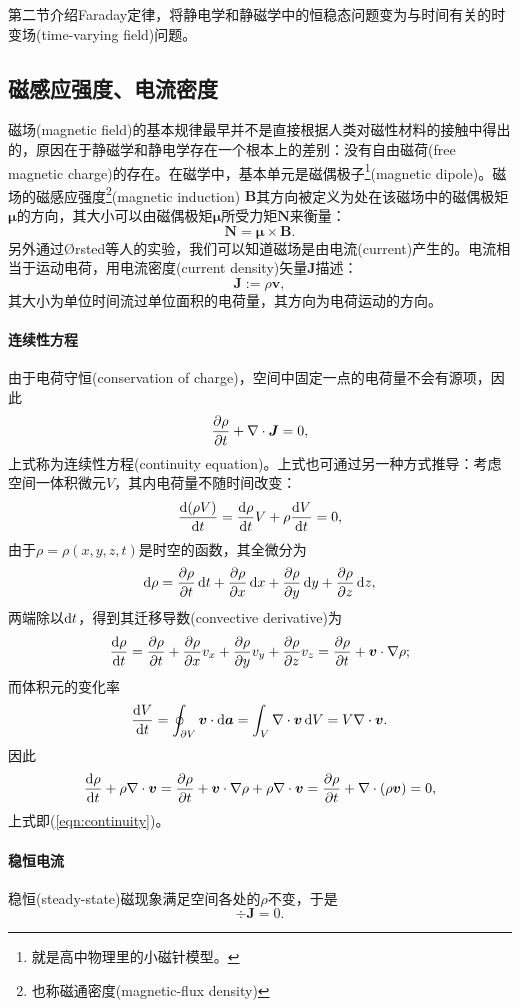 第二节介绍Faraday定律，将静电学和静磁学中的恒稳态问题变为与时间有关的时变场(time-varying field)问题。

\subsection{磁感应强度、电流密度}
磁场(magnetic field)的基本规律最早并不是直接根据人类对磁性材料的接触中得出的，原因在于静磁学和静电学存在一个根本上的差别：没有自由磁荷(free magnetic charge)的存在。在磁学中，基本单元是磁偶极子\footnote{就是高中物理里的小磁针模型。}(magnetic dipole)。磁场的磁感应强度\footnote{也称磁通密度(magnetic-flux density)}(magnetic induction) $\bm B$其方向被定义为处在该磁场中的磁偶极矩$\bm\mu$的方向，其大小可以由磁偶极矩$\bm\mu$所受力矩$\bm N$来衡量：
\begin{equation}
    \bm N=\bm\mu\times\bm B.
\end{equation}
另外通过Ørsted等人的实验，我们可以知道磁场是由电流(current)产生的。电流相当于运动电荷，用电流密度(current density)矢量$\bm J$描述：
\begin{equation}
    \bm J:=\rho\bm v,
\end{equation}
其大小为单位时间流过单位面积的电荷量，其方向为电荷运动的方向。
\paragraph{连续性方程}
由于电荷守恒(conservation of charge)，空间中固定一点的电荷量不会有源项，因此
\begin{equation}
    \label{eqn:continuity}
    \frac{\partial^{\;\!\!}\rho}{\partial t^{\;\!\!}}+\nabla\cdot\bm J=0,
\end{equation}
上式称为连续性方程(continuity equation)。上式也可通过另一种方式推导：考虑空间一体积微元$V$，其内电荷量不随时间改变：
\[
    \dv{(\rho V)}t=\dv\rho tV+\rho\dv Vt=0,
\]
由于$\rho=\rho(x,y,z,t)$是时空的函数，其全微分为
\[
    \d\rho=\pv\rho t\d t+\pv\rho x\d x+\pv\rho y\d y+\pv\rho z\d z,
\]
两端除以$\mathop{}\!\mathrm{d} t$，得到其迁移导数(convective derivative)为
\[
    \dv\rho t=\pv\rho t+\pv\rho xv_x+\pv\rho yv_y+\pv\rho zv_z=\pv\rho t+\bm v\cdot\nabla\rho;
\]
而体积元的变化率
\[
    \frac{\mathrm{d}^{\;\!\!}V}{\mathrm{d} t^{\;\!\!}}=\oint_{\partial V}\bm v\cdot\mathop{}\!\mathrm{d}\bm a=\int_V\nabla\cdot\bm v\mathop{}\!\mathrm{d} V=V\nabla\cdot\bm v.
\]
因此 
\[
    \dv\rho t+\rho\div\bm v=\pv\rho t+\bm v\cdot\nabla\rho+\rho\div\bm v=\pv\rho t+\div(\rho\bm v)=0,
\]
上式即(\ref{eqn:continuity})。
\paragraph{稳恒电流}
稳恒(steady-state)磁现象满足空间各处的$\rho$不变，于是%
\begin{equation}
    \div\bm J=0.
\end{equation}
